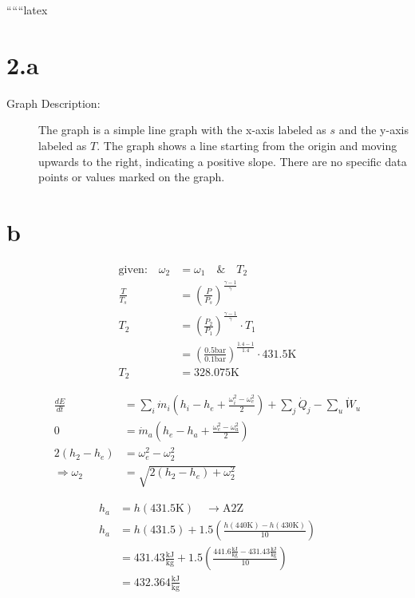 
``````latex


\section*{2.a}

\begin{description}
    \item[Graph Description:] The graph is a simple line graph with the x-axis labeled as $s$ and the y-axis labeled as $T$. The graph shows a line starting from the origin and moving upwards to the right, indicating a positive slope. There are no specific data points or values marked on the graph.
\end{description}

\section*{b}

\begin{align*}
    \text{given:} \quad \omega_2 &= \omega_1 \quad \& \quad T_2 \\
    \frac{T}{T_s} &= \left( \frac{P}{P_s} \right)^{\frac{\gamma-1}{\gamma}} \\
    T_2 &= \left( \frac{P_2}{P_1} \right)^{\frac{\gamma-1}{\gamma}} \cdot T_1 \\
    &= \left( \frac{0.5 \text{bar}}{0.1 \text{bar}} \right)^{\frac{1.4-1}{1.4}} \cdot 431.5 \text{K} \\
    T_2 &= 328.075 \text{K}
\end{align*}

\begin{align*}
    \frac{dE}{dt} &= \sum_i \dot{m}_i \left( h_i - h_e + \frac{\omega_i^2 - \omega_e^2}{2} \right) + \sum_j \dot{Q}_j - \sum_u \dot{W}_u \\
    0 &= \dot{m}_a \left( h_e - h_a + \frac{\omega_e^2 - \omega_a^2}{2} \right) \\
    2(h_2 - h_e) &= \omega_e^2 - \omega_2^2 \\
    \Rightarrow \omega_2 &= \sqrt{2(h_2 - h_e) + \omega_2^2}
\end{align*}

\begin{align*}
    h_a &= h \left( 431.5 \text{K} \right) \quad \rightarrow \text{A2Z} \\
    h_a &= h(431.5) + 1.5 \left( \frac{h(440 \text{K}) - h(430 \text{K})}{10} \right) \\
    &= 431.43 \frac{\text{kJ}}{\text{kg}} + 1.5 \left( \frac{441.6 \frac{\text{kJ}}{\text{kg}} - 431.43 \frac{\text{kJ}}{\text{kg}}}{10} \right) \\
    &= 432.364 \frac{\text{kJ}}{\text{kg}}
\end{align*}

